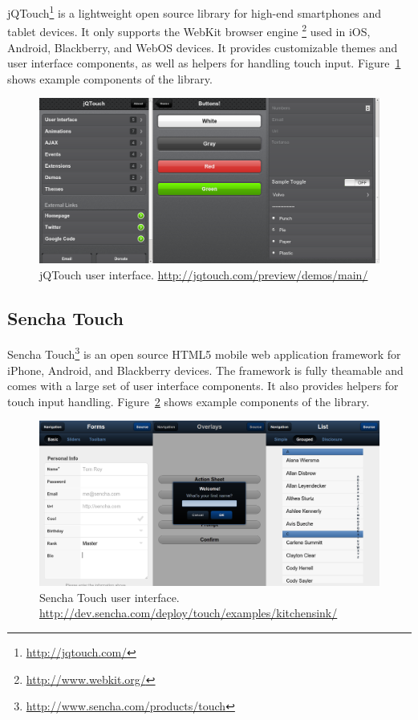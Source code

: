 jQTouch\footnote{\url{http://jqtouch.com/}} is a lightweight open
source library for high-end smartphones and tablet devices. It only
supports the WebKit browser
engine \footnote{\url{http://www.webkit.org/}} used in iOS, Android,
Blackberry, and WebOS devices. It provides customizable themes and
user interface components, as well as helpers for handling touch
input. Figure~\ref{figure:jqtouch.png} shows example components of the
library.

\begin{figure}[ht]
  \begin{center}
    \includegraphics[width=\textwidth]{images/jqtouch.png}
    \caption{jQTouch user
      interface. \url{http://jqtouch.com/preview/demos/main/}}
    \label{figure:jqtouch.png}
  \end{center}
\end{figure}

\subsection{Sencha Touch}

Sencha Touch\footnote{\url{http://www.sencha.com/products/touch}} is
an open source HTML5 mobile web application framework for iPhone,
Android, and Blackberry devices. The framework is fully theamable and
comes with a large set of user interface components. It also provides
helpers for touch input handling. Figure~\ref{figure:sencha.png} shows
example components of the library.

\begin{figure}[ht]
  \begin{center}
    \includegraphics[width=\textwidth]{images/sencha.png}
    \caption{Sencha Touch user
      interface. \url{http://dev.sencha.com/deploy/touch/examples/kitchensink/}}
    \label{figure:sencha.png}
  \end{center}
\end{figure}

